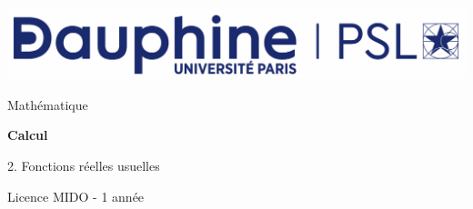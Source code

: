 \documentclass{report}
\author{Prénom NOM}
\begin{document}
\centering
\includegraphics[scale=0.08]{../../logo/Dauphine_PSL_grand}


\sffamily
\vspace{6cm}
\LARGE
\mdseries
Mathématique

\huge
\bfseries
Calcul

2. Fonctions réelles usuelles

\vspace{3cm}
\rmfamily

\mdseries
\makeatletter
\large
\@author

\vspace{0.2cm}
\normalsize
Licence MIDO - 1\iere{} année

\vspace{5cm}
\@date
\makeatother
\end{document}
